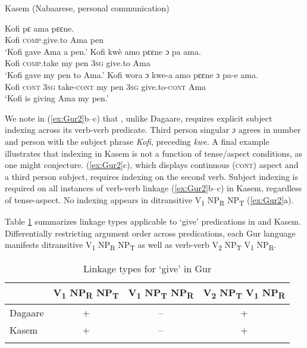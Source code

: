 \documentclass[output=paper,colorlinks,citecolor=brown]{langscibook}
\begin{document}
\ea \label{ex:Gur2} Kasem (Nabaarese, personal communication)
\begin{xlist}
\ex
\gll Kofi		pɛ									ama		pɛɛne.\\
	Kofi	\textsc{comp}.give.to		Ama	pen\\
\glt						‘Kofi gave Ama a pen.’
\ex
\gll	Kofi		kwè						amo		pɛɛne		ɔ				pa				ama.\\
	Kofi	\textsc{comp}.take	my		pen			3\textsc{sg}		give.to	Ama \\
\glt						‘Kofi gave my pen to Ama.’
\ex
\gll Kofi		wora		ɔ			kwe-a			amo		pɛɛne		ɔ			pa-e					ama.\\
Kofi	\textsc{cont}		3\textsc{sg}	take-\textsc{cont}	my	pen	3\textsc{sg}	give.to-\textsc{cont}	Ama\\
\glt						‘Kofi is giving Ama my pen.’
\end{xlist}
\z

We note in (\ref{ex:Gur2}b--c) that , unlike Dagaare, requires explicit subject indexing across its verb-verb predicate. Third person singular \textit{ɔ} agrees in number and person with the subject phrase \textit{Kofi}, preceding \textit{kwe}. A final example illustrates that indexing in Kasem is not a function of tense/aspect conditions, as one might conjecture. (\ref{ex:Gur2}c), which displays continuous (\textsc{cont}) aspect and a third person subject, requires indexing on the second verb. Subject indexing is required on all instances of verb-verb linkage (\ref{ex:Gur2}b--c) in Kasem, regardless of tense-aspect. No indexing appears in ditransitive V\textsubscript{1} NP\textsubscript{R} NP\textsubscript{T} (\ref{ex:Gur2}a).

Table \ref{tab:LinkageGur} summarizes linkage types applicable to ‘give’ predications in  and Kasem. Differentially restricting argument order across predications, each Gur language manifests ditransitive V\textsubscript{1} NP\textsubscript{R} NP\textsubscript{T} as well as verb-verb V\textsubscript{2} NP\textsubscript{T} V\textsubscript{1} NP\textsubscript{R}.

\begin{table}
\caption{Linkage types for ‘give’ in Gur}
\label{tab:LinkageGur}
 \begin{tabular}{lccc}
  \lsptoprule
 &  V\textsubscript{1} NP\textsubscript{R} NP\textsubscript{T}	&V\textsubscript{1} NP\textsubscript{T} NP\textsubscript{R} &	V\textsubscript{2} NP\textsubscript{T} V\textsubscript{1} NP\textsubscript{R}  \\
  \midrule
Dagaare &	+ &	--	&+\\
Kasem&	+&--	&+\\
  \lspbottomrule
 \end{tabular}
\end{table}
\end{document}
